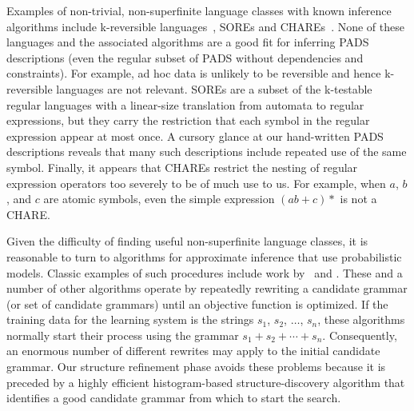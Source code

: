 Examples of non-trivial, non-superfinite
language classes with known inference algorithms include
k-reversible languages~\cite{angluin:revesible-language-inference},
SOREs and CHAREs~\cite{bex+:dtd-inference}.
None of these languages and the associated algorithms 
are a good fit for inferring PADS descriptions (even the
regular subset of PADS without dependencies and constraints).  
For example, ad hoc data is unlikely to be reversible and hence
k-reversible languages are not relevant.  
SOREs are a subset of the k-testable
regular languages with a linear-size translation from automata to
regular expressions, but they carry the restriction that each symbol
in the regular expression appear at most once.  A cursory glance at
our hand-written PADS descriptions reveals that many such descriptions
include repeated use of the same symbol.  Finally, it appears that
CHAREs restrict the nesting of regular expression operators too severely to 
be of much use to us.  For example, when $a$, $b$, and $c$ are atomic symbols,
even the simple expression $(ab + c)*$ is not a CHARE.

Given the difficulty of finding useful non-superfinite language classes,
it is reasonable to turn to algorithms for approximate
inference that use probabilistic models.    
Classic examples of such procedures include work by~\citet{stolcke94inducing} 
and 
\citet{hong:thesis}.  These and a number of other algorithms
operate by repeatedly rewriting a candidate grammar (or set of candidate
grammars) until an objective function is optimized.
If the training data for the learning system is the strings
$s_1$, $s_2$, $\ldots$, $s_n$, these algorithms normally start their
process using the grammar $s_1 + s_2 + \cdots + s_n$.  Consequently,  
an enormous number of different rewrites may apply to the
initial candidate grammar.  Our structure refinement
phase avoids these problems 
because it is preceded by a highly efficient
histogram-based structure-discovery algorithm 
that identifies a good candidate grammar from which to start the search.  

